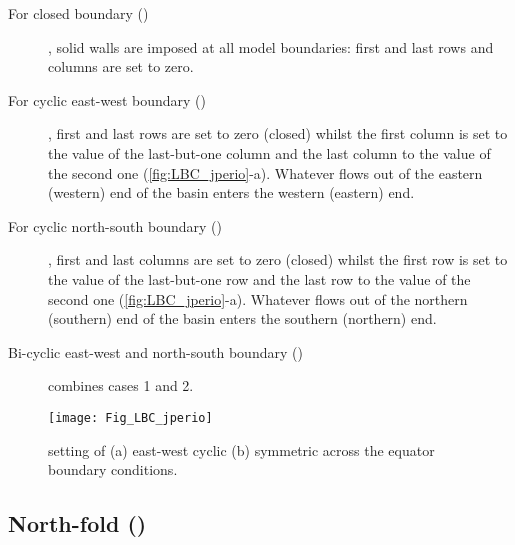 \documentclass[../main/NEMO_manual]{subfiles}
\begin{document}
\begin{description}

\item[For closed boundary ()],
  solid walls are imposed at all model boundaries:
  first and last rows and columns are set to zero.

\item[For cyclic east-west boundary ()],
  first and last rows are set to zero (closed) whilst the first column is set to
  the value of the last-but-one column and the last column to the value of the second one
  (\autoref{fig:LBC_jperio}-a).
  Whatever flows out of the eastern (western) end of the basin enters the western (eastern) end.

\item[For cyclic north-south boundary ()],
  first and last columns are set to zero (closed) whilst the first row is set to
  the value of the last-but-one row and the last row to the value of the second one
  (\autoref{fig:LBC_jperio}-a).
  Whatever flows out of the northern (southern) end of the basin enters the southern (northern) end.

\item[Bi-cyclic east-west and north-south boundary ()] combines cases 1 and 2.

\end{description}

\begin{figure}[!t]
  \begin{center}
    \texttt{[image: Fig\_LBC\_jperio]}
    \caption{
      \protect\label{fig:LBC_jperio}
      setting of (a) east-west cyclic  (b) symmetric across the equator boundary conditions.
    }
  \end{center}
\end{figure}

\subsection{North-fold (\protect{})}
\label{subsec:LBC_north_fold}
\end{document}
